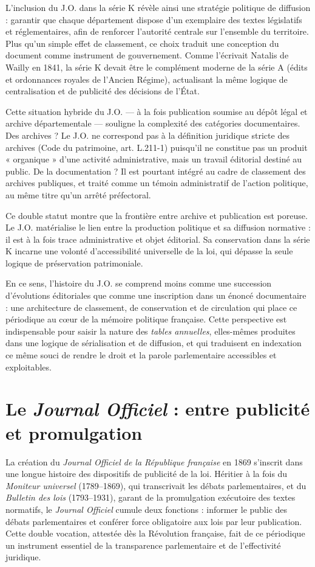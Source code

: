 L’inclusion du J.O. dans la série K révèle ainsi une stratégie politique de diffusion : garantir que chaque département dispose d’un exemplaire des textes législatifs et réglementaires, afin de renforcer l’autorité centrale sur l’ensemble du territoire. Plus qu’un simple effet de classement, ce choix traduit une conception du document comme instrument de gouvernement. Comme l’écrivait Natalis de Wailly en 1841, la série K devait être le complément moderne de la série A (édits et ordonnances royales de l’Ancien Régime), actualisant la même logique de centralisation et de publicité des décisions de l’État.

Cette situation hybride du J.O. — à la fois publication soumise au dépôt légal et archive départementale — souligne la complexité des catégories documentaires. Des archives ? Le J.O. ne correspond pas à la définition juridique stricte des archives (Code du patrimoine, art. L.211-1) puisqu’il ne constitue pas un produit « organique » d’une activité administrative, mais un travail éditorial destiné au public. De la documentation ? Il est pourtant intégré au cadre de classement des archives publiques, et traité comme un témoin administratif de l’action politique, au même titre qu’un arrêté préfectoral.

Ce double statut montre que la frontière entre archive et publication est poreuse. Le J.O. matérialise le lien entre la production politique et sa diffusion normative : il est à la fois trace administrative et objet éditorial. Sa conservation dans la série K incarne une volonté d’accessibilité universelle de la loi, qui dépasse la seule logique de préservation patrimoniale.

En ce sens, l’histoire du J.O. se comprend moins comme une succession d’évolutions éditoriales que comme une inscription dans un énoncé documentaire : une architecture de classement, de conservation et de circulation qui place ce périodique au cœur de la mémoire politique française. Cette perspective est indispensable pour saisir la nature des \emph{tables annuelles}, elles-mêmes produites dans une logique de sérialisation et de diffusion, et qui traduisent en indexation ce même souci de rendre le droit et la parole parlementaire accessibles et exploitables.

\section{Le \emph{Journal Officiel} : entre publicité et promulgation}

La création du \emph{Journal Officiel de la République française} en 1869 s’inscrit dans une longue histoire des dispositifs de publicité de la loi. Héritier à la fois du \emph{Moniteur universel} (1789–1869), qui transcrivait les débats parlementaires, et du \emph{Bulletin des lois} (1793–1931), garant de la promulgation exécutoire des textes normatifs, le \emph{Journal Officiel} cumule deux fonctions : informer le public des débats parlementaires et conférer force obligatoire aux lois par leur publication. Cette double vocation, attestée dès la Révolution française, fait de ce périodique un instrument essentiel de la transparence parlementaire et de l’effectivité juridique.

